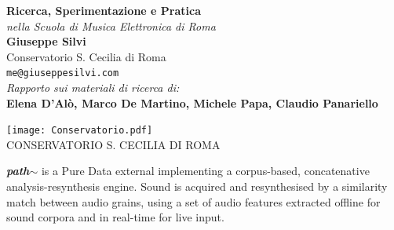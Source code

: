 \documentclass[a0,portrait]{a0poster}
\begin{document}
\begin{minipage}[b]{0.77\linewidth}
	\veryHuge
	\color{supercolor}
	\textbf{Ricerca, Sperimentazione e Pratica} \\%
\Huge\textit{nella Scuola di Musica Elettronica di Roma}\\%
\huge \textbf{Giuseppe Silvi}\\%
\huge Conservatorio S. Cecilia di Roma\\[-0.4cm] 
\Large \texttt{me@giuseppesilvi.com}\\[0.3cm] 
\large\textit{Rapporto sui materiali di ricerca di:}\\%
\huge \textbf{Elena D'Alò, Marco De Martino, Michele Papa, Claudio Panariello}\\%
\end{minipage}
\begin{minipage}[b]{0.23\linewidth}
\texttt{[image: Conservatorio.pdf]}\\
\large CONSERVATORIO S. CECILIA DI ROMA\\%
\end{minipage}

\vspace{1cm}

\color{supercolor}

\Large
\noindent\emph{\textbf{path$\sim$}} is a Pure Data external implementing a corpus-based, concatenative analysis-resynthesis engine. Sound is acquired and resynthesised by a similarity match between audio grains, using a set of audio features extracted offline for sound corpora and in real-time for live input. 

\vfill

\normalsize
\end{document}
